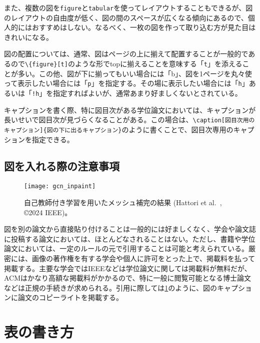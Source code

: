 また、複数の図を\texttt{figure}と\texttt{tabular}を使ってレイアウトすることもできるが、図のレイアウトの自由度が低く、図の間のスペースが広くなる傾向にあるので、個人的にはおすすめはしない。なるべく、一枚の図を作って取り込む方が見た目はきれいになる。

図の配置については、通常、図はページの上に揃えて配置することが一般的であるので\texttt{\textbackslash \{figure\}[t]}のような形でtopに揃えることを意味する「\texttt{t}」を添えることが多い。この他、図が下に揃ってもいい場合には「b」、図を1ページを丸々使って表示したい場合には「\texttt{p}」を指定する。その場に表示したい場合には「\texttt{h}」あるいは「\texttt{!h}」を指定すればよいが、通常あまり好ましくないとされている。

キャプションを書く際、特に図目次がある学位論文においては、キャプションが長いせいで図目次が見づらくなることがある。この場合は、\texttt{\textbackslash caption[図目次用のキャプション]\{図の下に出るキャプション\}}のように書くことで、図目次専用のキャプションを指定できる。

\subsection{図を入れる際の注意事項}

\begin{figure}[tbp]
  \centering
  \texttt{[image: gcn\_inpaint]}
  \caption[自己教師付き学習を用いたメッシュ補完の結果]{自己教師付き学習を用いたメッシュ補完の結果 (Hattori et al.~\cite{hattori2024learning}, \copyright 2024 IEEE)。}
  \label{fig:gcn-inpaint}
\end{figure}

図を別の論文から直接貼り付けることは一般的には好ましくなく、学会や論文誌に投稿する論文においては、ほとんどなされることはない。ただし、書籍や学位論文においては、一定のルールの元で引用することは可能と考えられている。厳密には、画像の著作権を有する学会や個人に許可をとった上で、掲載料を払って掲載する。主要な学会ではIEEEなどは学位論文に関しては掲載料が無料だが、ACMはかなり高額な掲載料がかかるので、特に一般に閲覧可能となる博士論文などは正規の手続きが求められる。引用に際しては\cref{fig:gcn-inpaint}のように、図のキャプションに論文のコピーライトを掲載する。


\section{表の書き方}
\label{sec:insert-table}


